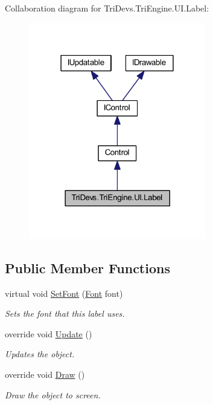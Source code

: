 Collaboration diagram for Tri\-Devs.\-Tri\-Engine.\-U\-I.\-Label\-:
\nopagebreak
\begin{figure}[H]
\begin{center}
\leavevmode
\includegraphics[width=219pt]{class_tri_devs_1_1_tri_engine_1_1_u_i_1_1_label__coll__graph}
\end{center}
\end{figure}
\subsection*{Public Member Functions}
\begin{DoxyCompactItemize}
\item 
virtual void \hyperlink{class_tri_devs_1_1_tri_engine_1_1_u_i_1_1_label_af225ee69e7ef87655aa4dbccccef311b}{Set\-Font} (\hyperlink{class_tri_devs_1_1_tri_engine_1_1_text_1_1_font}{Font} font)
\begin{DoxyCompactList}\small\item\em Sets the font that this label uses. \end{DoxyCompactList}\item 
override void \hyperlink{class_tri_devs_1_1_tri_engine_1_1_u_i_1_1_label_a542e0fda292f3bcbf9faad474480e007}{Update} ()
\begin{DoxyCompactList}\small\item\em Updates the object. \end{DoxyCompactList}\item 
override void \hyperlink{class_tri_devs_1_1_tri_engine_1_1_u_i_1_1_label_aa4faf404f0def672abd34b83407c4f62}{Draw} ()
\begin{DoxyCompactList}\small\item\em Draw the object to screen. \end{DoxyCompactList}\end{DoxyCompactItemize}
